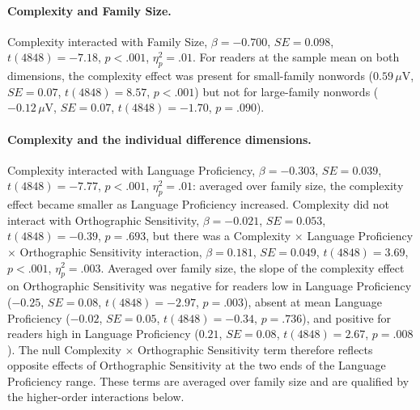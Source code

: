 \documentclass[utf8]{FrontiersinHarvard} %
\begin{document}
\paragraph*{Complexity and Family Size.} Complexity interacted with Family Size, $\beta = -0.700$, $SE = 0.098$, $t(4848) = -7.18$, $p < .001$, $\eta^2_p = .01$. For readers at the sample mean on both dimensions, the complexity effect was present for small-family nonwords ($0.59\,\mu$V, $SE = 0.07$, $t(4848) = 8.57$, $p < .001$) but not for large-family nonwords ($-0.12\,\mu$V, $SE = 0.07$, $t(4848) = -1.70$, $p = .090$).

\paragraph*{Complexity and the individual difference dimensions.} Complexity interacted with Language Proficiency, $\beta = -0.303$, $SE = 0.039$, $t(4848) = -7.77$, $p < .001$, $\eta^2_p = .01$: averaged over family size, the complexity effect became smaller as Language Proficiency increased. Complexity did not interact with Orthographic Sensitivity, $\beta = -0.021$, $SE = 0.053$, $t(4848) = -0.39$, $p = .693$, but there was a Complexity $\times$ Language Proficiency $\times$ Orthographic Sensitivity interaction, $\beta = 0.181$, $SE = 0.049$, $t(4848) = 3.69$, $p < .001$, $\eta^2_p = .003$. Averaged over family size, the slope of the complexity effect on Orthographic Sensitivity was negative for readers low in Language Proficiency ($-0.25$, $SE = 0.08$, $t(4848) = -2.97$, $p = .003$), absent at mean Language Proficiency ($-0.02$, $SE = 0.05$, $t(4848) = -0.34$, $p = .736$), and positive for readers high in Language Proficiency ($0.21$, $SE = 0.08$, $t(4848) = 2.67$, $p = .008$). The null Complexity $\times$ Orthographic Sensitivity term therefore reflects opposite effects of Orthographic Sensitivity at the two ends of the Language Proficiency range. These terms are averaged over family size and are qualified by the higher-order interactions below.
\end{document}
